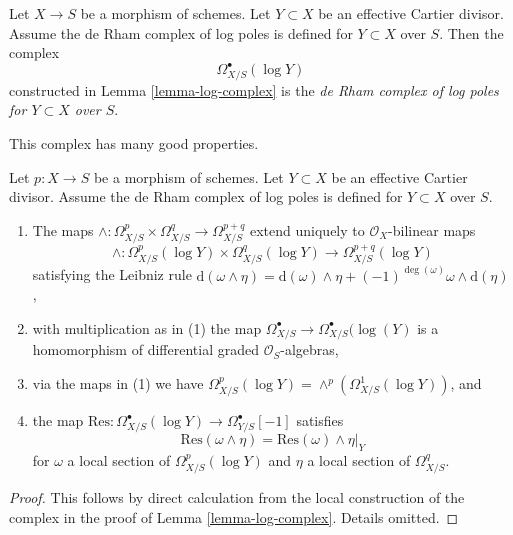 \begin{definition}
\label{definition-log-complex}
Let $X \to S$ be a morphism of schemes. Let $Y \subset X$ be an
effective Cartier divisor. Assume the de Rham complex of log poles
is defined for $Y \subset X$ over $S$. Then the complex
$$
\Omega^\bullet_{X/S}(\log Y)
$$
constructed in Lemma \ref{lemma-log-complex} is the
{\it de Rham complex of log poles for $Y \subset X$ over $S$}.
\end{definition}

\noindent
This complex has many good properties.

\begin{lemma}
\label{lemma-multiplication-log}
Let $p : X \to S$ be a morphism of schemes. Let $Y \subset X$ be an
effective Cartier divisor. Assume the de Rham complex of log poles
is defined for $Y \subset X$ over $S$.
\begin{enumerate}
\item The maps
$\wedge : \Omega^p_{X/S} \times \Omega^q_{X/S} \to \Omega^{p + q}_{X/S}$
extend uniquely to $\mathcal{O}_X$-bilinear maps
$$
\wedge : \Omega^p_{X/S}(\log Y) \times \Omega^q_{X/S}(\log Y)
\to \Omega^{p + q}_{X/S}(\log Y)
$$
satisfying the Leibniz rule
$
\text{d}(\omega \wedge \eta) = \text{d}(\omega) \wedge \eta +
(-1)^{\deg(\omega)} \omega \wedge \text{d}(\eta)$,
\item with multiplication as in (1) the map
$\Omega^\bullet_{X/S} \to \Omega^\bullet_{X/S}(\log(Y)$
is a homomorphism of differential graded $\mathcal{O}_S$-algebras,
\item via the maps in (1) we have $\Omega^p_{X/S}(\log Y) =
\wedge^p(\Omega^1_{X/S}(\log Y))$, and
\item the map
$\text{Res} : \Omega^\bullet_{X/S}(\log Y) \to \Omega^\bullet_{Y/S}[-1]$
satisfies
$$
\text{Res}(\omega \wedge \eta) = \text{Res}(\omega) \wedge \eta|_Y
$$
for $\omega$ a local section of $\Omega^p_{X/S}(\log Y)$ and $\eta$
a local section of $\Omega^q_{X/S}$.
\end{enumerate}
\end{lemma}

\begin{proof}
This follows by direct calculation from the local construction
of the complex in the proof of Lemma \ref{lemma-log-complex}.
Details omitted.
\end{proof}

